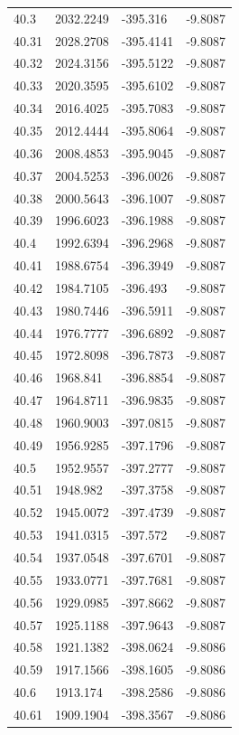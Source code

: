 \begin{table}[H]
\begin{tabular}{llll}
40.3 & 2032.2249 & -395.316 & -9.8087 \\
40.31 & 2028.2708 & -395.4141 & -9.8087 \\
40.32 & 2024.3156 & -395.5122 & -9.8087 \\
40.33 & 2020.3595 & -395.6102 & -9.8087 \\
40.34 & 2016.4025 & -395.7083 & -9.8087 \\
40.35 & 2012.4444 & -395.8064 & -9.8087 \\
40.36 & 2008.4853 & -395.9045 & -9.8087 \\
40.37 & 2004.5253 & -396.0026 & -9.8087 \\
40.38 & 2000.5643 & -396.1007 & -9.8087 \\
40.39 & 1996.6023 & -396.1988 & -9.8087 \\
40.4 & 1992.6394 & -396.2968 & -9.8087 \\
40.41 & 1988.6754 & -396.3949 & -9.8087 \\
40.42 & 1984.7105 & -396.493 & -9.8087 \\
40.43 & 1980.7446 & -396.5911 & -9.8087 \\
40.44 & 1976.7777 & -396.6892 & -9.8087 \\
40.45 & 1972.8098 & -396.7873 & -9.8087 \\
40.46 & 1968.841 & -396.8854 & -9.8087 \\
40.47 & 1964.8711 & -396.9835 & -9.8087 \\
40.48 & 1960.9003 & -397.0815 & -9.8087 \\
40.49 & 1956.9285 & -397.1796 & -9.8087 \\
40.5 & 1952.9557 & -397.2777 & -9.8087 \\
40.51 & 1948.982 & -397.3758 & -9.8087 \\
40.52 & 1945.0072 & -397.4739 & -9.8087 \\
40.53 & 1941.0315 & -397.572 & -9.8087 \\
40.54 & 1937.0548 & -397.6701 & -9.8087 \\
40.55 & 1933.0771 & -397.7681 & -9.8087 \\
40.56 & 1929.0985 & -397.8662 & -9.8087 \\
40.57 & 1925.1188 & -397.9643 & -9.8087 \\
40.58 & 1921.1382 & -398.0624 & -9.8086 \\
40.59 & 1917.1566 & -398.1605 & -9.8086 \\
40.6 & 1913.174 & -398.2586 & -9.8086 \\
40.61 & 1909.1904 & -398.3567 & -9.8086 \\

\end{tabular}
\end{table}
